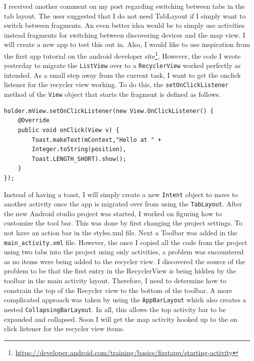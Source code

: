 \documentclass[fontsize=11pt, %
                             paper=a4, %
                             twoside, %
                             captions=tableheading,
                             index=totoc,
                             hyperref]{labbook}
\begin{document}
\begin{addmargin}[0cm]{0cm}
I received another comment on my post regarding switching between tabs in the tab layout. The user suggested that I do not need TabLayout if I simply want to switch between fragments. An even better idea would be to simply use activities instead fragments for switching between discovering devices and the map view. I will create a new app to test this out in. Also, I would like to use inspiration from the first app tutorial on the android developer site\footnote{\url{https://developer.android.com/training/basics/firstapp/starting-activity}}. However, the code I wrote yesterday to migrate the \texttt{ListView} over to a \texttt{RecyclerView} worked perfectly as intended. As a small step away from the current task, I want to get the onclick listener for the recycler view working. To do this, the \texttt{setOnClickListener} method of the \texttt{View} object that starts the fragment is defined as follows.
\begin{Verbatim}
holder.mView.setOnClickListener(new View.OnClickListener() {
	@Override
	public void onClick(View v) {
		Toast.makeText(mContext,"Hello at " + 
		Integer.toString(position),
		Toast.LENGTH_SHORT).show();
	}
});
\end{Verbatim}
Instead of having a toast, I will simply create a new \texttt{Intent} object to move to another activity once the app is migrated over from using the \texttt{TabLayout}. 
\medbreak\noindent
After the new Android studio project was started, I worked on figuring how to customize the tool bar. This was done by first changing the project settings. To not have an action bar in the styles.xml file. Next a Toolbar was added in the \texttt{main\_activity.xml} file. However, the once I copied all the code from the project using two tabs into the project using only activities, a problem was encountered as no items were being added to the recycler view.
\medbreak\noindent
I discovered the source of the problem to be that the first entry in the RecyclerView is being hidden by the toolbar in the main activity layout. Therefore, I need to determine how to constrain the top of the Recycler view to the bottom of the toolbar. A more complicated approach was taken by using the \texttt{AppBarLayout} which also creates a nested \texttt{CollapsingBarLayout}. In all, this allows the top activity bar to be expanded and collapsed. Soon I will get the map activity hooked up to the on click listener for the recycler view items.


\end{addmargin}
\end{document}
